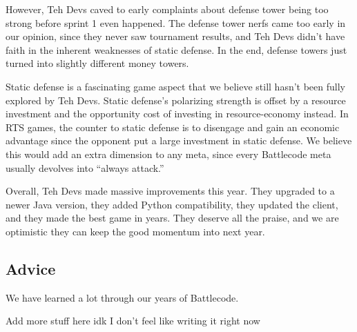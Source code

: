 \medskip

However, Teh Devs caved to early complaints about defense tower being too strong before sprint 1 even happened. The defense tower nerfs came too early in our opinion, since they never saw tournament results, and Teh Devs didn't have faith in the inherent weaknesses of static defense. In the end, defense towers just turned into slightly different money towers.

\medskip

Static defense is a fascinating game aspect that we believe still hasn't been fully explored by Teh Devs. Static defense's polarizing strength is offset by a resource investment and the opportunity cost of investing in resource-economy instead. In RTS games, the counter to static defense is to disengage and gain an economic advantage since the opponent put a large investment in static defense. We believe this would add an extra dimension to any meta, since every Battlecode meta usually devolves into ``always attack.''

\medskip

Overall, Teh Devs made massive improvements this year. They upgraded to a newer Java version, they added Python compatibility, they updated the client, and they made the best game in years. They deserve all the praise, and we are optimistic they can keep the good momentum into next year.

\subsection{Advice}

We have learned a lot through our years of Battlecode.
\begin{center}
  Add more stuff here idk I don't feel like writing it right now
\end{center}

